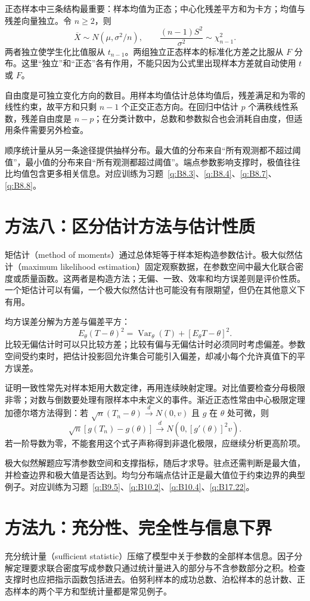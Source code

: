 \documentclass[12pt,fontset=fandol]{ctexart}
\begin{document}
正态样本中三条结构最重要：样本均值为正态；中心化残差平方和为卡方；均值与残差向量独立。令 $n\ge2$，则
\[
\overline X\sim N(\mu,\sigma^2/n),\qquad\frac{(n-1)S^2}{\sigma^2}\sim\chi^2_{n-1}.
\]
两者独立使学生化比值服从 $t_{n-1}$。两组独立正态样本的标准化方差之比服从 $F$ 分布。这里“独立”和“正态”各有作用，不能只因为公式里出现样本方差就自动使用 $t$ 或 $F$。

自由度是可独立变化方向的数目。用样本均值估计总体均值后，残差满足和为零的线性约束，故平方和只剩 $n-1$ 个正交正态方向。在回归中估计 $p$ 个满秩线性系数，残差自由度是 $n-p$；在分类计数中，总数和参数拟合也会消耗自由度，但适用条件需要另外检查。

顺序统计量从另一条途径提供抽样分布。最大值的分布来自“所有观测都不超过阈值”，最小值的分布来自“所有观测都超过阈值”。端点参数影响支撑时，极值往往比均值包含更多相关信息。对应训练为习题~\ref{q:B8.3}、\ref{q:B8.4}、\ref{q:B8.7}、\ref{q:B8.8}。

\section*{方法八：区分估计方法与估计性质}
矩估计（method of moments）通过总体矩等于样本矩构造参数估计。极大似然估计（maximum likelihood estimation）固定观察数据，在参数空间中最大化联合密度或质量函数。这两者是构造方法；无偏、一致、效率和均方误差则是评价性质。一个矩估计可以有偏，一个极大似然估计也可能没有有限期望，但仍在其他意义下有用。

均方误差分解为方差与偏差平方：
\[
E_\theta(T-\theta)^2=\operatorname{Var}_\theta(T)+[E_\theta T-\theta]^2.
\]
比较无偏估计时可以只比较方差；比较有偏与无偏估计时必须同时考虑偏差。参数空间受约束时，把估计投影回允许集合可能引入偏差，却减小每个允许真值下的平方误差。

证明一致性常先对样本矩用大数定律，再用连续映射定理。对比值要检查分母极限非零；对数与倒数要处理有限样本中未定义的事件。渐近正态性常由中心极限定理加德尔塔方法得到：若 $\sqrt n(T_n-\theta)\xrightarrow dN(0,v)$ 且 $g$ 在 $\theta$ 处可微，则
\[
\sqrt n[g(T_n)-g(\theta)]\xrightarrow dN(0,[g'(\theta)]^2v).
\]
若一阶导数为零，不能套用这个式子声称得到非退化极限，应继续分析更高阶项。

极大似然解题应写清参数空间和支撑指标，随后才求导。驻点还需判断是最大值，并检查边界和极大值是否达到。均匀分布端点估计正是最大值位于约束边界的典型例子。对应训练为习题~\ref{q:B9.5}、\ref{q:B10.2}、\ref{q:B10.4}、\ref{q:B17.22}。

\section*{方法九：充分性、完全性与信息下界}
充分统计量（sufficient statistic）压缩了模型中关于参数的全部样本信息。因子分解定理要求联合密度写成参数只通过统计量进入的部分与不含参数部分之积。检查支撑时也应把指示函数包括进去。伯努利样本的成功总数、泊松样本的总计数、正态样本的两个平方和型统计量都是常见例子。
\end{document}
